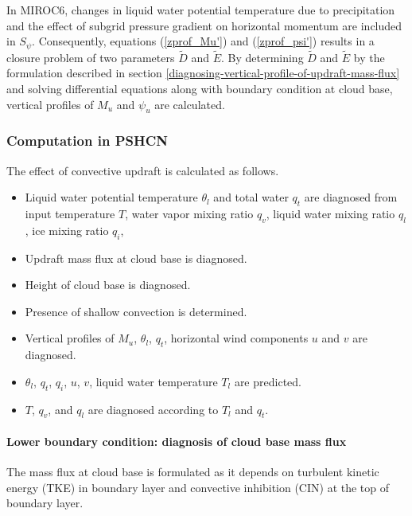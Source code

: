 In MIROC6, changes in liquid water potential temperature due to precipitation and the effect of subgrid pressure gradient on horizontal momentum are included in $S_{\psi}$.
Consequently, equations (\ref{zprof_Mu'}) and (\ref{zprof_psi'}) results in a closure problem of two parameters $\tilde{D}$ and $\tilde{E}$.
By determining $\tilde{D}$ and $\tilde{E}$ by the formulation described in section \ref{diagnosing-vertical-profile-of-updraft-mass-flux} 
and solving differential equations along with boundary condition at cloud base, vertical profiles of $M_u$ and $\psi_u$ are calculated.

\subsubsection{Computation in PSHCN}\label{computation-in-PSHCN}

The effect of convective updraft is calculated as follows.
\begin{itemize}
    \item Liquid water potential temperature $\theta_l$ and total water $q_t$ are diagnosed from input temperature $T$, water vapor mixing ratio $q_v$, liquid water mixing ratio $q_l$, ice mixing ratio $q_i$, 
    \item Updraft mass flux at cloud base is diagnosed.
    \item Height of cloud base is diagnosed.
    \item Presence of shallow convection is determined.
    \item Vertical profiles of $M_u$, $\theta_l$, $q_t$, horizontal wind components $u$ and $v$ are diagnosed.
    \item $\theta_l$, $q_t$, $q_i$, $u$, $v$, liquid water temperature $T_l$ are predicted.
    \item $T$, $q_v$, and $q_l$ are diagnosed according to $T_l$ and $q_t$.
\end{itemize}

\paragraph{Lower boundary condition: diagnosis of cloud base mass flux}\label{lower-boundary-condition}

The mass flux at cloud base is formulated as it depends on turbulent kinetic energy (TKE) in boundary layer and convective inhibition (CIN) at the top of boundary layer.


